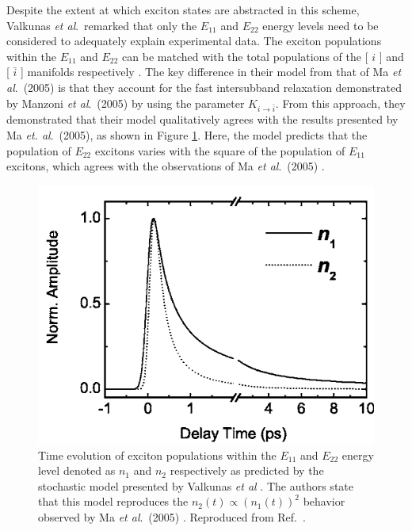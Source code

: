 Despite the extent at which exciton states are abstracted in this scheme, Valkunas \textit{et al}.\ remarked that only the $E_{11}$ and $E_{22}$ energy levels need to be considered to adequately explain experimental data. The exciton populations within the $E_{11}$ and $E_{22}$ can be matched with the total populations of the [ $i$ ] and [ $\bar{i}$ ] manifolds respectively \cite{valkunas2006exciton}. The key difference in their model from that of Ma \textit{et al}.\ (2005) \cite{ma2005femtosecond} is that they account for the fast intersubband relaxation demonstrated by Manzoni \textit{et al}.\ (2005) \cite{manzoni2005intersubband} by using the parameter $K_{i \rightarrow \bar{i}}$.
From this approach, they demonstrated that their model qualitatively agrees with the results presented by Ma \textit{et. al}.\ (2005), \cite{ma2005femtosecond} as shown in Figure \ref{fig:e11_e22_pop_valkunas}. Here, the model predicts that the population of $E_{22}$ excitons varies with the square of the population of $E_{11}$ excitons, which agrees with the observations of Ma \textit{et al}.\ (2005) \cite{ma2005femtosecond}.

\begin{figure}[H]
	\centering
	\includegraphics[scale=0.4]{images/chapter_prior_works/e11_e22_population_valkunas_2006}
	\caption{Time evolution of exciton populations within the $E_{11}$ and $E_{22}$ energy level denoted as $n_1$ and $n_2$ respectively as predicted by the stochastic model presented by Valkunas \textit{et al} \cite{valkunas2006exciton}. The authors state that this model reproduces the $n_2(t) \propto (n_1(t))^2$ behavior observed by Ma \textit{et al}.\ (2005) \cite{ma2005femtosecond}. Reproduced from Ref.\ \cite{valkunas2006exciton}. }
	\label{fig:e11_e22_pop_valkunas}
\end{figure}

